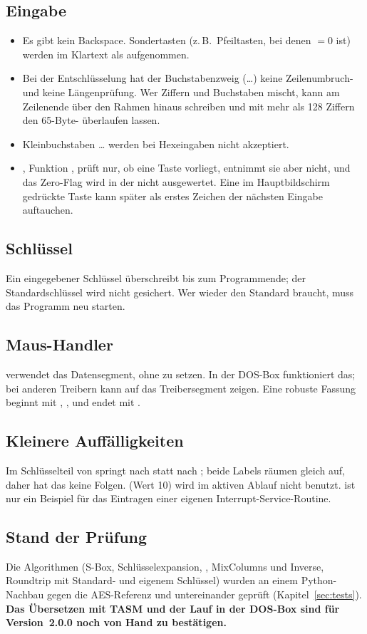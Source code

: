 \subsection{Eingabe}
\begin{itemize}[noitemsep]
    \item Es gibt kein Backspace. Sondertasten (z.\,B.\ Pfeiltasten, bei denen  $=0$ ist) werden im Klartext als  aufgenommen.
    \item Bei der Entschlüsselung hat der Buchstabenzweig (\ldots{}) keine Zeilenumbruch- und keine Längenprüfung. Wer Ziffern und Buchstaben mischt, kann am Zeilenende über den Rahmen hinaus schreiben und mit mehr als 128 Ziffern den 65-Byte- überlaufen lassen.
    \item Kleinbuchstaben \ldots{} werden bei Hexeingaben nicht akzeptiert.
    \item {}, Funktion , prüft nur, ob eine Taste vorliegt, entnimmt sie aber nicht, und das Zero-Flag wird in der  nicht ausgewertet. Eine im Hauptbildschirm gedrückte Taste kann später als erstes Zeichen der nächsten Eingabe auftauchen.
\end{itemize}

\subsection{Schlüssel}
Ein eingegebener Schlüssel überschreibt  bis zum Programmende; der Standardschlüssel wird nicht gesichert. Wer wieder den Standard braucht, muss das Programm neu starten.

\subsection{Maus-Handler}
 verwendet das Datensegment, ohne  zu setzen. In der DOS-Box funktioniert das; bei anderen Treibern kann  auf das Treibersegment zeigen. Eine robuste Fassung beginnt mit , ,  und endet mit .

\subsection{Kleinere Auffälligkeiten}
Im Schlüsselteil von  springt  nach  statt nach ; beide Labels räumen gleich auf, daher hat das keine Folgen.  (Wert 10) wird im aktiven Ablauf nicht benutzt.  ist nur ein Beispiel für das Eintragen einer eigenen Interrupt-Service-Routine.

\subsection{Stand der Prüfung}
Die Algorithmen (S-Box, Schlüsselexpansion, , MixColumns und Inverse, Roundtrip mit Standard- und eigenem Schlüssel) wurden an einem Python-Nachbau gegen die AES-Referenz und untereinander geprüft (Kapitel~\ref{sec:tests}). \textbf{Das Übersetzen mit TASM und der Lauf in der DOS-Box sind für Version~2.0.0 noch von Hand zu bestätigen.}
